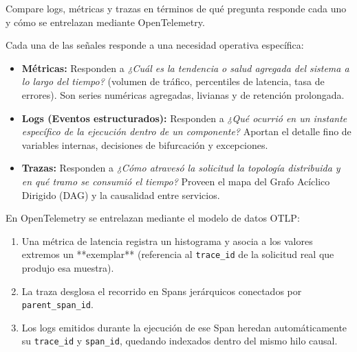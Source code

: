 \documentclass[variant=guia,cover=institutional,mode=screen]{ua-engineering-v6-article}
\begin{document}
\begin{uaexercise}
Compare logs, métricas y trazas en términos de qué pregunta responde cada uno y cómo se entrelazan mediante OpenTelemetry.
\end{uaexercise}
\begin{uaanswer}
Cada una de las señales responde a una necesidad operativa específica:
\begin{itemize}
\item \textbf{Métricas:} Responden a \emph{¿Cuál es la tendencia o salud agregada del sistema a lo largo del tiempo?} (volumen de tráfico, percentiles de latencia, tasa de errores). Son series numéricas agregadas, livianas y de retención prolongada.
\item \textbf{Logs (Eventos estructurados):} Responden a \emph{¿Qué ocurrió en un instante específico de la ejecución dentro de un componente?} Aportan el detalle fino de variables internas, decisiones de bifurcación y excepciones.
\item \textbf{Trazas:} Responden a \emph{¿Cómo atravesó la solicitud la topología distribuida y en qué tramo se consumió el tiempo?} Proveen el mapa del Grafo Acíclico Dirigido (DAG) y la causalidad entre servicios.
\end{itemize}
En OpenTelemetry se entrelazan mediante el modelo de datos OTLP:
\begin{enumerate}
\item Una métrica de latencia registra un histograma y asocia a los valores extremos un **exemplar** (referencia al \texttt{trace\_id} de la solicitud real que produjo esa muestra).
\item La traza desglosa el recorrido en Spans jerárquicos conectados por \texttt{parent\_span\_id}.
\item Los logs emitidos durante la ejecución de ese Span heredan automáticamente su \texttt{trace\_id} y \texttt{span\_id}, quedando indexados dentro del mismo hilo causal.
\end{enumerate}
\end{uaanswer}
\end{document}
